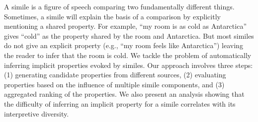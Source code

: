 A simile is a figure of speech comparing two fundamentally different things. Sometimes, a simile will explain the basis of a comparison by explicitly mentioning a shared property. For example, ``my room is as cold as Antarctica'' gives ``cold'' as the property shared by the room and Antarctica. But most similes do not give an explicit property (e.g., ``my room feels like Antarctica'') leaving the reader to infer that the room is cold. We tackle the problem of automatically inferring implicit properties evoked by similes. Our approach involves three steps: (1) generating candidate properties from different sources, (2) evaluating properties based on the influence of multiple simile components, and (3) aggregated ranking of the properties. We also present an analysis showing that the difficulty of inferring an implicit property for a simile correlates with its interpretive diversity.
